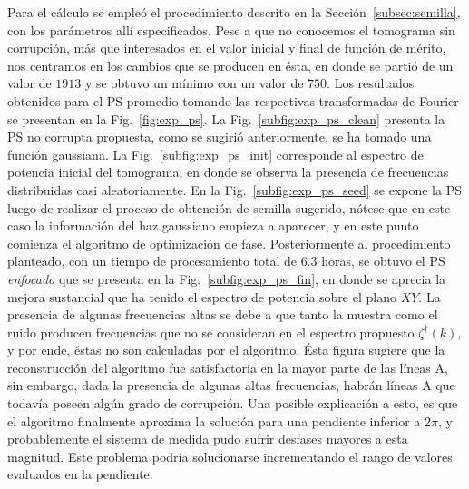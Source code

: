 Para el cálculo se empleó el procedimiento descrito en la Sección~\ref{subsec:semilla}, con los parámetros allí especificados. Pese a que no conocemos el tomograma sin corrupción, más que interesados en el valor inicial y final de función de mérito, nos centramos en los cambios que se producen en ésta, en donde se partió de un valor de $1913$ y se obtuvo un mínimo con un valor de $750$. Los resultados obtenidos para el PS promedio tomando las respectivas transformadas de Fourier se presentan en la Fig.~\ref{fig:exp_ps}. La Fig.~\ref{subfig:exp_ps_clean} presenta la PS no corrupta propuesta, como se sugirió anteriormente, se ha tomado una función gaussiana. La Fig.~\ref{subfig:exp_ps_init} corresponde al espectro de potencia inicial del tomograma, en donde se observa la presencia de frecuencias distribuidas casi aleatoriamente. En la Fig.~\ref{subfig:exp_ps_seed} se expone la PS luego de realizar el proceso de obtención de semilla sugerido, nótese que en este caso la información del haz gaussiano empieza a aparecer, y en este punto comienza el algoritmo de optimización de fase. Posteriormente al procedimiento planteado, con un tiempo de procesamiento total de $6.3$ horas, se obtuvo el PS \textit{enfocado} que se presenta en la Fig.~\ref{subfig:exp_ps_fin}, en donde se aprecia la mejora sustancial que ha tenido el espectro de potencia sobre el plano $XY$. La presencia de algunas frecuencias altas se debe a que tanto la muestra como el ruido producen frecuencias que no se consideran en el espectro propuesto $\zeta^\dagger(k)$, y por ende, éstas no son calculadas por el algoritmo. Ésta figura sugiere que la reconstrucción del algoritmo fue satisfactoria en la mayor parte de las líneas A, sin embargo, dada la presencia de algunas altas frecuencias, habrán líneas A que todavía poseen algún grado de corrupción. Una posible explicación a esto, es que el algoritmo finalmente aproxima la solución para una pendiente inferior a $2\pi$, y probablemente el sistema de medida pudo sufrir desfases mayores a esta magnitud. Este problema podría solucionarse incrementando el rango de valores evaluados en la pendiente.


